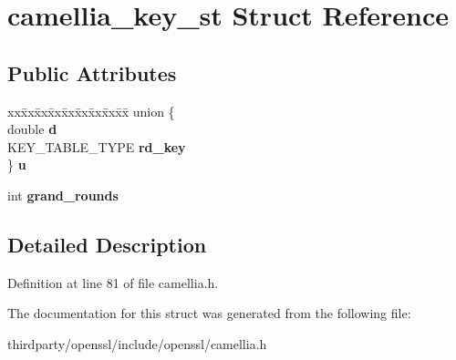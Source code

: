 \hypertarget{structcamellia__key__st}{}\section{camellia\+\_\+key\+\_\+st Struct Reference}
\label{structcamellia__key__st}
\subsection*{Public Attributes}
\begin{DoxyCompactItemize}
\item 
\mbox{\label{structcamellia__key__st_afc3082815abdc5ab3a031f619cda704a}} 
\begin{tabbing}
xx\=xx\=xx\=xx\=xx\=xx\=xx\=xx\=xx\=\kill
union \{\\
\>double {\bfseries d}\\
\>KEY\_TABLE\_TYPE {\bfseries rd\_key}\\
\} {\bfseries u}\\

\end{tabbing}\item 
\mbox{\label{structcamellia__key__st_ae0eb815e40c45d92126984b6645a7d96}} 
int {\bfseries grand\+\_\+rounds}
\end{DoxyCompactItemize}


\subsection{Detailed Description}


Definition at line 81 of file camellia.\+h.



The documentation for this struct was generated from the following file\+:\begin{DoxyCompactItemize}
\item 
thirdparty/openssl/include/openssl/camellia.\+h\end{DoxyCompactItemize}
